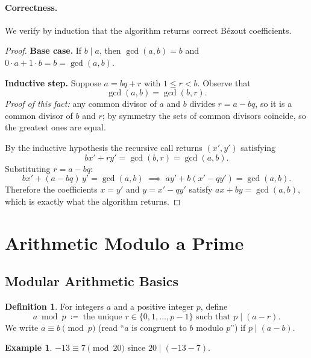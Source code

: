 \documentclass[11pt]{article}
\theoremstyle{plain}
\theoremstyle{definition}
\newtheorem{definition}[theorem]{Definition}
\newtheorem{example}[theorem]{Example}
\begin{document}
\paragraph{Correctness.}
We verify by induction that the algorithm returns correct B\'ezout
coefficients.

\begin{proof}
  \textbf{Base case.} If $b \mid a$, then $\gcd(a, b) = b$ and
  $0 \cdot a + 1 \cdot b = b = \gcd(a, b)$. \checkmark

  \textbf{Inductive step.} Suppose $a = bq + r$ with $1 \le r < b$.
  Observe that
  \[
    \gcd(a, b) = \gcd(b, r).
  \]
  \textit{Proof of this fact:} any common divisor of $a$ and $b$ divides
  $r = a - bq$, so it is a common divisor of $b$ and $r$; by symmetry
  the sets of common divisors coincide, so the greatest ones are equal.

  By the inductive hypothesis the recursive call returns $(x', y')$
  satisfying
  \[
    bx' + ry' = \gcd(b, r) = \gcd(a, b).
  \]
  Substituting $r = a - bq$:
  \[
    bx' + (a - bq)\,y' = \gcd(a, b)
    \;\implies\;
    a y' + b(x' - qy') = \gcd(a, b).
  \]
  Therefore the coefficients $x = y'$ and $y = x' - qy'$ satisfy
  $ax + by = \gcd(a, b)$, which is exactly what the algorithm returns.
\end{proof}

\section{Arithmetic Modulo a Prime}

\subsection{Modular Arithmetic Basics}

\begin{definition}
  For integers $a$ and a positive integer $p$, define
  \[
    a \bmod p \;\coloneqq\; \text{the unique } r \in \{0, 1, \ldots, p-1\}
    \text{ such that } p \mid (a - r).
  \]
  We write $a \equiv b \pmod{p}$ (read ``$a$ is congruent to $b$
  modulo $p$'') if $p \mid (a - b)$.
\end{definition}

\begin{example}
  $-13 \equiv 7 \pmod{20}$ since $20 \mid (-13 - 7)$.
\end{example}
\end{document}
